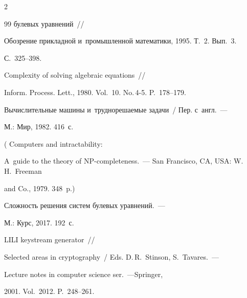 \begin{multicols}{2}
{{\begin{thebibliography}{99}
{булевых уравнений}~//


        Обозрение прикладной и~промышленной математики, 1995. Т.~2. Вып.~3. 


С.~325--398.









        {Complexity of solving algebraic equations}~//


        Inform. Process. Lett., 1980. Vol.~10. No.\,4-5. P.~178--179.









        Вычислительные машины и~труднорешаемые задачи~/ Пер. с~англ.~---


        М.: Мир, 1982. 416~с.


        ( Computers and intractability: 


A~guide to the theory of NP-completeness.~--- San Francisco, CA, USA: W.\,H.~Freeman 


and Co., 1979. 348~p.)









        Сложность решения сис\-тем булевых уравнений.~---


        М.: Курс, 2017. 192~с.





  









        LILI keystream generator~//


        Selected areas in cryptography~/ Eds. D.\,R.~Stinson, S.~Tavares.~---


        Lecture notes in computer science ser.~---Springer, 


        2001. Vol.~2012. P.~248--261.



\end{thebibliography}}}
\end{multicols}
